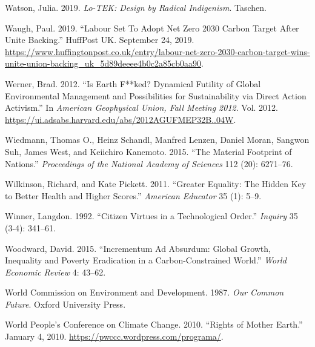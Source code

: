 \documentclass[a4paper, nobind]{templates/ociamthesis}
\newlength{\cslhangindent}
\newenvironment{CSLReferences}[2] %
 {%
  \setlength{\parindent}{0pt}
  \ifodd #1
  \let\oldpar\par
  \def\par{\hangindent=\cslhangindent\oldpar}
  \fi
  \setlength{\parskip}{1mm}
  \setlength{\baselineskip}{6mm}
 }%
 {}
\begin{document}
\begin{CSLReferences}{1}{0}
\leavevmode{}%
Watson, Julia. 2019. \emph{Lo-{TEK}: {Design} by {Radical Indigenism}}. {Taschen}.

\leavevmode{}%
Waugh, Paul. 2019. {``Labour {Set To Adopt Net Zero} 2030 {Carbon Target After Unite Backing}.''} {HuffPost UK}. September 24, 2019. \url{https://www.huffingtonpost.co.uk/entry/labour-net-zero-2030-carbon-target-wins-unite-union-backing_uk_5d89deeee4b0c2a85cb0aa90}.

\leavevmode{}%
Werner, Brad. 2012. {``Is {Earth F}**ked? {Dynamical Futility} of {Global Environmental Management} and {Possibilities} for {Sustainability} via {Direct Action Activism}.''} In \emph{American {Geophysical Union}, {Fall Meeting} 2012}. Vol. 2012. \url{https://ui.adsabs.harvard.edu/abs/2012AGUFMEP32B..04W}.

\leavevmode{}%
Wiedmann, Thomas O., Heinz Schandl, Manfred Lenzen, Daniel Moran, Sangwon Suh, James West, and Keiichiro Kanemoto. 2015. {``The Material Footprint of Nations.''} \emph{Proceedings of the National Academy of Sciences} 112 (20): 6271--76.

\leavevmode{}%
Wilkinson, Richard, and Kate Pickett. 2011. {``Greater {Equality}: {The Hidden Key} to {Better Health} and {Higher Scores}.''} \emph{American Educator} 35 (1): 5--9.

\leavevmode{}%
Winner, Langdon. 1992. {``Citizen Virtues in a Technological Order.''} \emph{Inquiry} 35 (3-4): 341--61.

\leavevmode{}%
Woodward, David. 2015. {``Incrementum Ad Absurdum: Global Growth, Inequality and Poverty Eradication in a Carbon-Constrained World.''} \emph{World Economic Review} 4: 43--62.

\leavevmode{}%
World Commission on Environment and Development. 1987. \emph{Our {Common Future}}. {Oxford University Press}.

\leavevmode{}%
World People's Conference on Climate Change. 2010. {``Rights of {Mother Earth}.''} January 4, 2010. \url{https://pwccc.wordpress.com/programa/}.


\end{CSLReferences}
\end{document}
